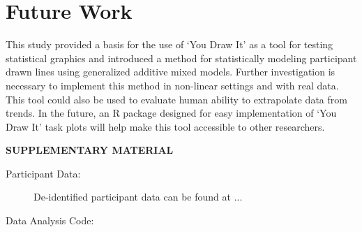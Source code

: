 \documentclass[12pt]{article}
\begin{document}
\hypertarget{future-work}{%
\section{Future Work}\label{future-work}}

This study provided a basis for the use of `You Draw It' as a tool for
testing statistical graphics and introduced a method for statistically
modeling participant drawn lines using generalized additive mixed
models. Further investigation is necessary to implement this method in
non-linear settings and with real data. This tool could also be used to
evaluate human ability to extrapolate data from trends. In the future,
an R package designed for easy implementation of `You Draw It' task
plots will help make this tool accessible to other researchers.

\begin{center}
{\large\bf SUPPLEMENTARY MATERIAL}
\end{center}

\begin{description}

\item[Participant Data:] De-identified participant data can be found at ...

\item[Data Analysis Code:] 

\end{description}



\end{document}

